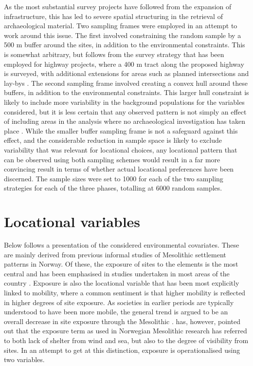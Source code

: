 \documentclass[12pt, a4paper]{article}
\begin{document}
As the most substantial survey projects have followed from the expansion of infrastructure, this has led to severe spatial structuring in the retrieval of archaeological material. Two sampling frames were employed in an attempt to work around this issue. The first involved constraining the random sample by a 500 m buffer around the sites, in addition to the environmental constraints. This is somewhat arbitrary, but follows from the survey strategy that has been employed for highway projects, where a 400 m tract along the proposed highway is surveyed, with additional extensions for areas such as planned intersections and lay-bys \citep[][7]{eskeland2017}. The second sampling frame involved creating a convex hull around these buffers, in addition to the environmental constraints. This larger hull constraint is likely to include more variability in the background populations for the variables considered, but it is less certain that any observed pattern is not simply an effect of including areas in the analysis where no archaeological investigation has taken place \citep[cf.][217]{kvamme2020}. While the smaller buffer sampling frame is not a safeguard against this effect, and the considerable reduction in sample space is likely to exclude variability that was relevant for locational choices, any locational pattern that can be observed using both sampling schemes would result in a far more convincing result in terms of whether actual locational preferences have been discerned. The sample sizes were set to 1000 for each of the two sampling strategies for each of the three phases, totalling at 6000 random samples.\par

\section{Locational variables}
Below follows a presentation of the considered environmental covariates. These are mainly derived from previous informal studies of Mesolithic settlement patterns in Norway. Of these, the exposure of sites to the elements is the most central and has been emphasised in studies undertaken in most areas of the country \citep[][]{bjerck2008, berghansen2009, aastveit2014}. Exposure is also the locational variable that has been most explicitly linked to mobility, where a common sentiment is that higher mobility is reflected in higher degrees of site exposure. As societies in earlier periods are typically understood to have been more mobile, the general trend is argued to be an overall decrease in site exposure through the Mesolithic \citep[e.g.][]{lindblom1984, jaksland2001, bjerck2008, breivik2018}. \cite{svendsen2014} has, however, pointed out that the exposure term as used in Norwegian Mesolithic research has referred to both lack of shelter from wind and sea, but also to the degree of visibility from sites. In an attempt to get at this distinction, exposure is operationalised using two variables. \par
\end{document}
